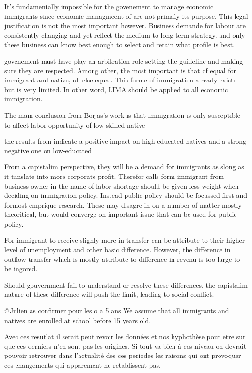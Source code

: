It's fundamentally impossible for the govenement to manage economic immigrants since economic managmeent of are not primaly its purpose. This legal justification is not the most important however. Business demande for labour are consistently changing and yet reflect the medium to long term strategy. and only these business can know best enough to select and retain what profile is best.

govenement must have play an arbitration role setting the guideline and making sure they are respected. Among other, the most important is that of equal for immigrant and native, all else equal. This forme of immigration already existe but is very limited. In other word, LIMA should be applied to all economic immigration.



The main conclusion from Borjas's work is that immigration is only susceptible to affect labor opportunity of low-skilled native\citep{Piche:2013ir}

the results from \citet{Fusaro:2018wi} indicate a positive impact on high-educated natives and a strong negative one on low-educated



From a capistalim perspective, they will be a demand for immigrants as slong as it tanslate into more corporate profit. Therefor calls form immigrant from business owner in the name of labor shortage should be given less weight when deciding on immigration policy. Instead public policy should be focussed first and formost emprique research. These may disagre in on a number of matter mostly theoritical, but would converge on important issue that can be used for public policy.

For immigrant to receive slighly more in transfer can be attribute to their higher level of unemployment and other basic difference. However, the difference in outflow transfer which is mostly attribute to difference in revenu is too large to be ingored.

Should gouvernment fail to understand or resolve these differences, the capistalim nature of these difference will push the limit, leading to social conflict.





@Julien
as confirmer pour les o a 5 ans
We assume that all immigrants and natives are enrolled at school before 15 years old.

Avec ces resutlat il serait peut revoir les données et nos hyphothèse pour etre sur que ces derniers n'en sont pas les origines. Si tout va bien à ces niveau on devrait pouvoir retrouver dans l'actualité des ces periodes les raisons qui ont provoquer ces changements qui apparement ne retablissent pas.


